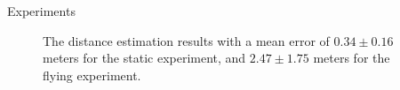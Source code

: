 \documentclass{beamer}
\begin{document}
\begin{frame}{Experiments}

\begin{figure}[H]
	\centering
	\caption{
            The distance estimation results with a mean error of
            $0.34 \pm 0.16$ meters for the static experiment, and
            $2.47 \pm 1.75$ meters for the flying experiment.
        }
	\label{fig:uav33_37}
\end{figure}

\end{frame}
\end{document}
